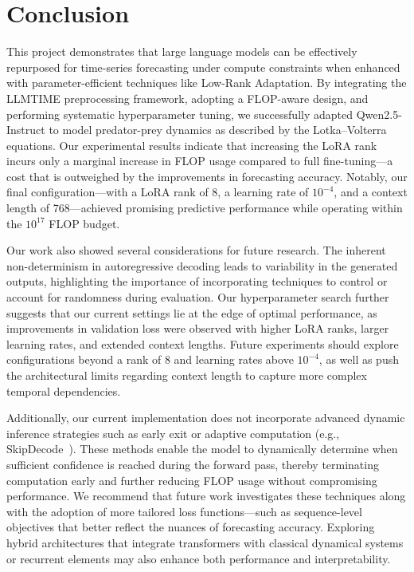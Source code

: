 \documentclass[a4paper,12pt]{article}
\begin{document}
  \section{Conclusion}

  This project demonstrates that large language models can be effectively repurposed for time-series forecasting under compute constraints when enhanced with parameter-efficient techniques like Low-Rank Adaptation. By integrating the LLMTIME preprocessing framework, adopting a FLOP-aware design, and performing systematic hyperparameter tuning, we successfully adapted Qwen2.5-Instruct to model predator-prey dynamics as described by the Lotka–Volterra equations. Our experimental results indicate that increasing the LoRA rank incurs only a marginal increase in FLOP usage compared to full fine-tuning—a cost that is outweighed by the improvements in forecasting accuracy. Notably, our final configuration—with a LoRA rank of 8, a learning rate of $10^{-4}$, and a context length of 768—achieved promising predictive performance while operating within the $10^{17}$ FLOP budget.
  
  Our work also showed several considerations for future research. The inherent non-determinism in autoregressive decoding leads to variability in the generated outputs, highlighting the importance of incorporating techniques to control or account for randomness during evaluation. Our hyperparameter search further suggests that our current settings lie at the edge of optimal performance, as improvements in validation loss were observed with higher LoRA ranks, larger learning rates, and extended context lengths. Future experiments should explore configurations beyond a rank of 8 and learning rates above $10^{-4}$, as well as push the architectural limits regarding context length to capture more complex temporal dependencies.
  
  Additionally, our current implementation does not incorporate advanced dynamic inference strategies such as early exit or adaptive computation (e.g., SkipDecode~\cite{delcorro2023skipdecode}). These methods enable the model to dynamically determine when sufficient confidence is reached during the forward pass, thereby terminating computation early and further reducing FLOP usage without compromising performance. We recommend that future work investigates these techniques along with the adoption of more tailored loss functions—such as sequence-level objectives that better reflect the nuances of forecasting accuracy. Exploring hybrid architectures that integrate transformers with classical dynamical systems or recurrent elements may also enhance both performance and interpretability.
  
\end{document}

